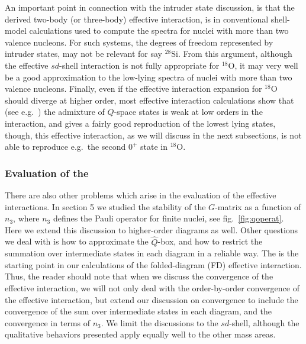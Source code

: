 An important point in connection with the intruder state discussion,
is that the derived two-body (or three-body) effective interaction,
is in conventional shell-model calculations used to compute 
the spectra for nuclei with more than two valence nucleons.
For such systems, the degrees of freedom represented by 
intruder states, may not be relevant for say $^{28}$Si. From 
this argument, although the effective $sd$-shell interaction
is not fully appropriate for $^{18}$O, it may very well
be a good approximation to the low-lying spectra 
of nuclei with more than two valence nucleons. 
Finally, even if the effective interaction expansion for $^{18}$O should
diverge at higher order, most effective interaction calculations 
show that (see e.g.\ \cite{eehho94}) the admixture of 
$Q$-space states is weak at low orders in the interaction, and
gives a fairly good reproduction of the lowest lying states,
though, this effective interaction, 
as we will discuss in the next subsections,
is not able to reproduce e.g.\ the second $0^+$ state in $^{18}$O.

\subsubsection{Evaluation of the \qbox}

There are also other problems which arise in the
evaluation of the effective interactions.
In section 5 we studied the stability of the
$G$-matrix
as a function of $n_3$, where $n_3$ defines the Pauli operator
for finite nuclei, see
fig.\ \ref{fig:qoperat}.
Here we extend this discussion to higher-order
diagrams as well.
Other questions we deal with is how to approximate the $\hat{Q}$-box,
and how to restrict the summation over intermediate states
in each \qbox diagram in  a reliable way. The \qbox is the starting
point in our calculations of the folded-diagram (FD) effective
interaction.
Thus, the reader should note that when we discuss the convergence
of the effective interaction, we will not only deal with
the order-by-order convergence of the effective interaction, but
extend our discussion on convergence to include the convergence
of the sum over intermediate states in each diagram, and the convergence
in terms of $n_3$.
We limit the discussions  to the $sd$-shell,
although the qualitative behaviors presented apply equally well to the
other mass areas.

